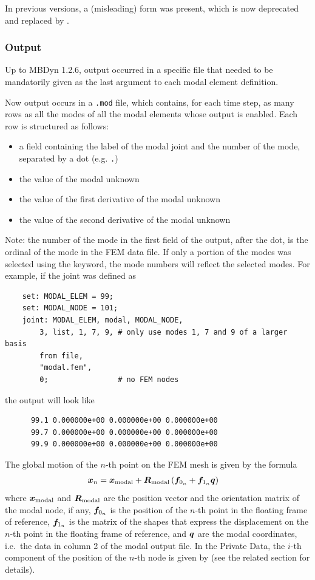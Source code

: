 In previous versions, a (misleading)  form
was present, which is now deprecated and replaced by .



\subsubsection{Output}
Up to MBDyn 1.2.6, output occurred in a specific file that needed
to be mandatorily given as the last argument to each modal element
definition.

Now output occurs in a \texttt{.mod} file, which contains, for each time step,
as many rows as all the modes of all the modal elements whose output is enabled.
Each row is structured as follows:
\begin{itemize}
\item a field containing the label of the modal joint and the number of the mode,
separated by a dot (e.g. \texttt{.})
\item the value of the modal unknown
\item the value of the first derivative of the modal unknown
\item the value of the second derivative of the modal unknown
\end{itemize}
Note: the number of the mode in the first field of the output, after the dot,
is the ordinal of the mode in the FEM data file.
If only a portion of the modes was selected using the  keyword,
the mode numbers will reflect the selected modes.
For example, if the  joint was defined as
\begin{verbatim}
    set: MODAL_ELEM = 99;
    set: MODAL_NODE = 101;
    joint: MODAL_ELEM, modal, MODAL_NODE,
        3, list, 1, 7, 9, # only use modes 1, 7 and 9 of a larger basis
        from file,
        "modal.fem",
        0;                # no FEM nodes
\end{verbatim}
the output will look like
\begin{verbatim}
      99.1 0.000000e+00 0.000000e+00 0.000000e+00
      99.7 0.000000e+00 0.000000e+00 0.000000e+00
      99.9 0.000000e+00 0.000000e+00 0.000000e+00
\end{verbatim}
The global motion of the $n$-th point on the FEM mesh is given by the formula
\begin{align}
	\boldsymbol{x}_n
	&=
	\boldsymbol{x}_\text{modal}
	+
	\boldsymbol{R}_\text{modal} \left( 
		\boldsymbol{f}_{0_n}
		+
		\boldsymbol{f}_{1_n} \boldsymbol{q}
	 \right)
\end{align}
where $\boldsymbol{x}_\text{modal}$ and $\boldsymbol{R}_\text{modal}$
are the position vector and the orientation matrix of the modal node, if any,
$\boldsymbol{f}_{0_n}$ is the position of the $n$-th point in the floating frame of reference,
$\boldsymbol{f}_{1_n}$ is the matrix of the shapes that express the displacement on the $n$-th point
in the floating frame of reference, and $\boldsymbol{q}$ are the modal coordinates,
i.e.\ the data in column 2 of the modal output file.
In the Private Data, the $i$-th component of the position of the $n$-th node
is given by  (see the related section for details).



